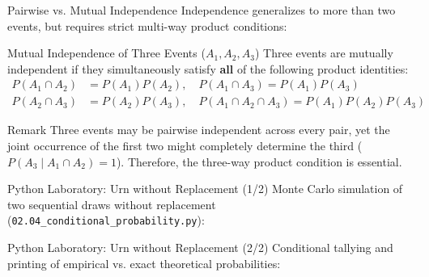\documentclass[10pt,aspectratio=169]{beamer}
\begin{document}
\begin{frame}{Pairwise vs. Mutual Independence}
  \footnotesize
  Independence generalizes to more than two events, but requires strict multi-way product conditions: \pause

  \vspace{0.1em}
  \begin{block}{Mutual Independence of Three Events ($A_1, A_2, A_3$)}
    Three events are mutually independent if they simultaneously satisfy \textbf{all} of the following product identities:
    \begin{align*}
      P(A_1 \cap A_2) &= P(A_1)P(A_2), \quad P(A_1 \cap A_3) = P(A_1)P(A_3) \\
      P(A_2 \cap A_3) &= P(A_2)P(A_3), \quad P(A_1 \cap A_2 \cap A_3) = P(A_1)P(A_2)P(A_3)
    \end{align*}
  \end{block}

  \vspace{0.1em}
  \pause
  \begin{block}{Remark}
    Three events may be pairwise independent across every pair, yet the joint occurrence of the first two might completely determine the third ($P(A_3 \mid A_1 \cap A_2) = 1$). Therefore, the three-way product condition is essential.
  \end{block}
\end{frame}

\begin{frame}[fragile]{Python Laboratory: Urn without Replacement (1/2)}
  Monte Carlo simulation of two sequential draws without replacement (\texttt{02.04\_conditional\_probability.py}):
  \vspace{0.2em}
  {
  }
\end{frame}

\begin{frame}[fragile]{Python Laboratory: Urn without Replacement (2/2)}
  Conditional tallying and printing of empirical vs. exact theoretical probabilities:
  \vspace{0.2em}
  {
  }
\end{frame}
\end{document}
